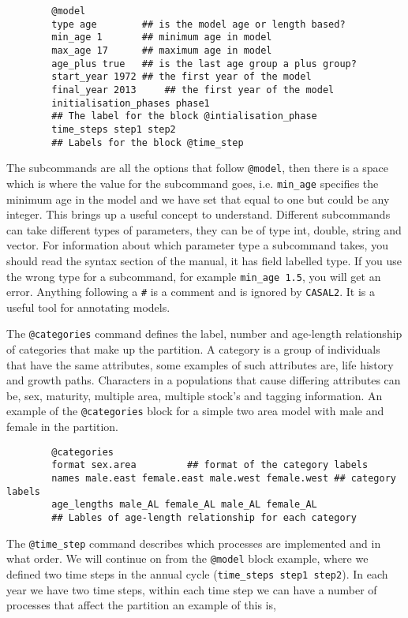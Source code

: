 \documentclass[12pt]{article}
\makeatletter
\newcommand{\cas}{\texttt{CASAL2}}
\newcommand{\command}[1] {\texttt{@#1}}
\makeatother
\begin{document}
{\small{\begin{verbatim}
		@model
		type age		## is the model age or length based?
		min_age 1		## minimum age in model
		max_age 17		## maximum age in model
		age_plus true	## is the last age group a plus group?
		start_year 1972	## the first year of the model
		final_year 2013 	## the first year of the model
		initialisation_phases phase1	
		## The label for the block @intialisation_phase
		time_steps step1 step2
		## Labels for the block @time_step
		\end{verbatim}}}
The subcommands are all the options that follow \command{model}, then there is a space which is where the value for the subcommand goes, i.e. \texttt{min\_age} specifies the minimum age in the model and we have set that equal to one but could be any integer. This brings up a useful concept to understand. Different subcommands can take different types of parameters, they can be of type int, double, string and vector. For information about which parameter type a subcommand takes, you should read the syntax section of the manual, it has field labelled type. If you use the wrong type for a subcommand, for example \texttt{min\_age 1.5}, you will get an error. Anything following a \texttt{\#} is a comment and is ignored by \cas. It is a useful tool for annotating models. 

The \command{categories} command defines the label, number and age-length relationship of categories that make up the partition. A category is a group of individuals that have the same attributes, some examples of such attributes are, life history and growth paths. Characters in a populations that cause differing attributes can be, sex, maturity, multiple area, multiple stock's and tagging information. An example of the \command{categories} block for a simple two area model with male and female in the partition.

{\small{\begin{verbatim}
		@categories
		format sex.area			## format of the category labels
		names male.east female.east male.west female.west ## category labels
		age_lengths male_AL female_AL male_AL female_AL	
		## Lables of age-length relationship for each category
		\end{verbatim}}}
\pagebreak
The \command{time\_step} command describes which processes are implemented and in what order. We will continue on from the \command{model} block example, where we defined two time steps in the annual cycle (\texttt{time\_steps step1 step2}). In each year we have two time steps, within each time step we can have a number of processes that affect the partition an example of this is,
\end{document}
